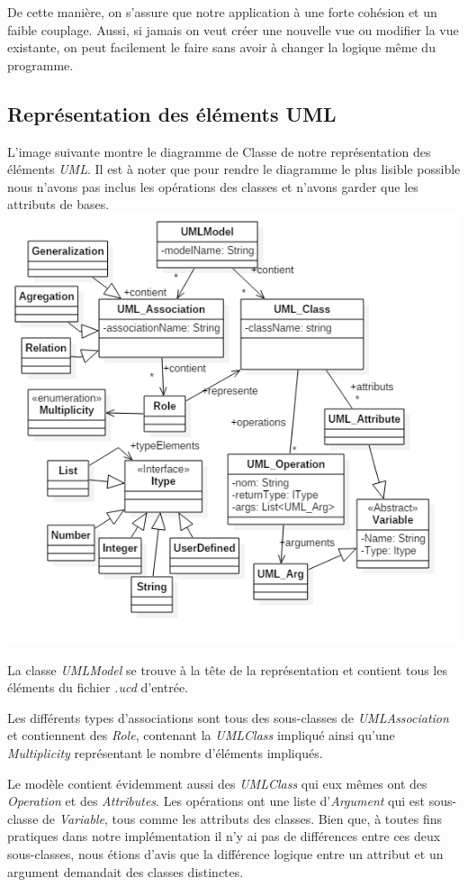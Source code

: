 \documentclass[letter,french]{report}
\begin{document}
	De cette manière, on s’assure que notre application à une forte cohésion et
  un faible couplage. Aussi, si jamais on veut créer une nouvelle vue ou
  modifier la vue existante, on peut facilement le faire sans avoir à changer
  la logique même du programme.
	
	\subsection*{Représentation des éléments UML}
	L'image suivante montre le diagramme de Classe de notre représentation des
  éléments \emph{UML}. Il est à noter que pour rendre le diagramme le plus
  lisible possible nous n'avons pas inclus les opérations des classes et n'avons
  garder que les attributs de bases.
	\newline 
	\includegraphics[scale=.7]{UML_diagram.png}

  La classe \emph{UMLModel} se trouve à la tête de la représentation et
  contient tous les éléments du fichier \emph{.ucd} d'entrée.

  Les différents types d'associations sont tous des sous-classes de
  \emph{UMLAssociation} et contiennent des \emph{Role}, contenant la
  \emph{UMLClass} impliqué ainsi qu'une \emph{Multiplicity} représentant le
  nombre d'éléments impliqués.

  Le modèle contient évidemment aussi des \emph{UMLClass} qui eux mêmes ont des
  \emph{Operation} et des \emph{Attributes}. Les opérations ont une liste
  d'\emph{Argument} qui est sous-classe de \emph{Variable}, tous comme les
  attributs des classes. Bien que, à toutes fins pratiques dans notre
  implémentation il n'y ai pas de différences entre ces deux sous-classes, nous
  étions d'avis que la différence logique entre un attribut et un argument
  demandait des classes distinctes.
\end{document}
